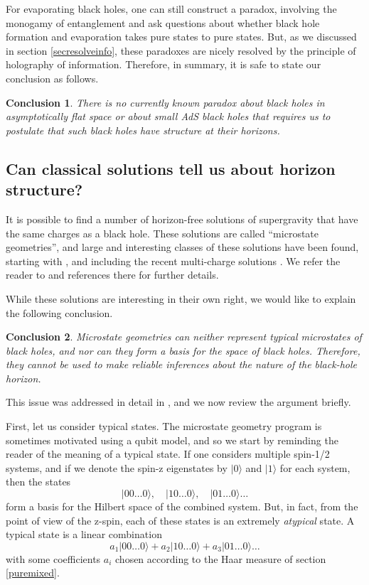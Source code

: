 \documentclass[12pt]{article}
\newcommand{\be}{\begin{equation}}
\newcommand{\ee}{\end{equation}}
\newtheorem{lesson}{Conclusion}
\begin{document}
For evaporating black holes,  one can still construct a paradox, involving the monogamy of entanglement and ask questions about whether black hole formation and evaporation takes pure states to pure states. But, as we discussed in section \ref{secresolveinfo}, these paradoxes are nicely resolved by the principle of holography of information.  Therefore, in summary, it is safe to state our conclusion as follows.
\begin{lesson}
\label{lessonevap}
There is no currently known paradox about black holes in asymptotically flat space or about small AdS black holes that requires us to postulate that such black holes have structure at their horizons. 
\end{lesson}








\subsection{Can classical solutions tell us about horizon structure? \label{seccanclass}}

It is possible to find a number of horizon-free solutions of supergravity that have the same charges as a black hole. These solutions are called ``microstate geometries'', and large and interesting classes of these solutions have been found, starting with \cite{Lunin:2001fv,Lunin:2002bj}, and including the recent multi-charge solutions \cite{Bena:2016ypk,Bena:2015bea,Bena:2017xbt}. We refer the reader to  \cite{Mathur:2005zp,Bena:2007kg,Bena:2013dka} and references there for  further details.


While these solutions are interesting in their own right, we would like to explain the following conclusion. 
\begin{lesson}
\label{lessonfuzzballs}
Microstate geometries can neither represent typical microstates of black holes, and nor can they form a basis for the space of black holes. Therefore, they cannot be used to make reliable inferences about the nature of the black-hole horizon.
\end{lesson}
This issue was addressed in detail in  \cite{Raju:2018xue}, and we now review the argument briefly.

First, let us consider typical states.  The microstate geometry program is sometimes motivated using a qubit model, and so we start by reminding the reader of the meaning of a typical state. If one considers multiple spin-1/2 systems, and if we denote the spin-z eigenstates by $|0 \rangle$ and $|1 \rangle$ for each system, then the states
\be
\label{basis}
|0 0 \ldots 0 \rangle, \quad |1 0 \ldots 0 \rangle,  \quad |0 1 \ldots 0 \rangle \ldots 
\ee
form a basis for the Hilbert space of the combined system.  But, in fact, from the point of view of the z-spin, each of these states is an extremely {\em atypical} state. A typical state is a linear combination
\be
a_1 |0 0 \ldots 0 \rangle + a_2 |1 0 \ldots 0 \rangle + a_3 |0 1 \ldots 0 \rangle \ldots 
\ee
with some coefficients $a_i$ chosen according to the Haar measure of section \ref{puremixed}. 
\end{document}
